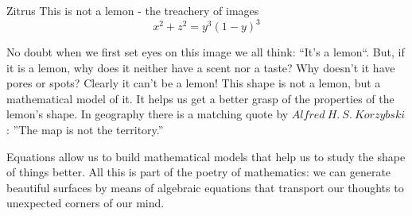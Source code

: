 \begin{surferPage}{Zitrus}
This is not a lemon - the treachery of images\\
\smallskip
\[x^2 + z^2 = y^3 (1 - y)^3\] 


\singlespacing
No doubt when we first set eyes on this image we all think: ``It's a lemon``. But, if it is a lemon, why does it neither have a scent nor a taste? Why doesn't it have pores or spots? Clearly it can't be a lemon! 
\singlespacing
This shape is not a lemon, but a mathematical model of it. It helps us get a better grasp of the properties of the lemon's shape. In geography there is a matching quote by $Alfred\ H.\ S.\ Korzybski$: ''The map is not the territory.'' \\
\singlespacing

Equations allow us to build mathematical models that help us to study the shape of things better. 
\singlespacing
All this is part of the poetry of mathematics: we can generate beautiful surfaces by means of algebraic equations that transport our thoughts to unexpected corners of our mind.
\end{surferPage}
